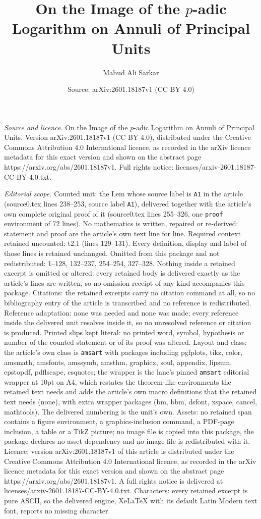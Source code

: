 \documentclass[10pt,a4paper]{amsart}
\title[On the Image of the $p$-adic Logarithm on Annuli of Principa]{On the Image of the $p$-adic Logarithm on Annuli of Principal Units}
\author{Mabud Ali Sarkar}
\date{Source: arXiv:2601.18187v1 (CC BY 4.0)}
\begin{document}
\maketitle

\noindent\emph{Source and licence.} On the Image of the $p$-adic Logarithm on Annuli of Principal Units. Version arXiv:2601.18187v1 (CC BY 4.0), distributed under the Creative Commons Attribution 4.0 International licence, as recorded in the arXiv licence metadata for this exact version and shown on the abstract page https://arxiv.org/abs/2601.18187v1. Full rights notice: licenses/arxiv-2601.18187-CC-BY-4.0.txt.\par\smallskip

\noindent\textit{Editorial scope.} Counted unit: the Lem whose source label is \texttt{A1} in the article (source0.tex lines 238--253, source label \texttt{A1}), delivered together with the article's own complete original proof of it (source0.tex lines 255--326, one \texttt{proof} environment of 72 lines). No mathematics is written, repaired or re-derived: statement and proof are the article's own text line for line. Required context retained uncounted: t2.1 (lines 129--131). Every definition, display and label of those lines is retained unchanged. Omitted from this package and not redistributed: 1--128, 132--237, 254--254, 327--328. Nothing inside a retained excerpt is omitted or altered: every retained body is delivered exactly as the article's lines are written, so no omission receipt of any kind accompanies this package. Citations: the retained excerpts carry no citation command at all, so no bibliography entry of the article is transcribed and no reference is redistributed. Reference adaptation: none was needed and none was made; every reference inside the delivered unit resolves inside it, so no unresolved reference or citation is produced. Printed slips kept literal: no printed word, symbol, hypothesis or number of the counted statement or of its proof was altered. Layout and class: the article's own class is \texttt{amsart} with packages including pgfplots, tikz, color, amsmath, amsfonts, amssymb, amsthm, graphicx, soul, appendix, lipsum, epstopdf, pdflscape, csquotes; the wrapper is the lane's pinned \texttt{amsart} editorial wrapper at 10pt on A4, which restates the theorem-like environments the retained text needs and adds the article's own macro definitions that the retained text needs (none), with extra wrapper packages (bm, bbm, dsfont, xspace, cancel, mathtools). The delivered numbering is the unit's own. Assets: no retained span contains a figure environment, a graphics-inclusion command, a PDF-page inclusion, a table or a TikZ picture; no image file is copied into this package, the package declares no asset dependency and no image file is redistributed with it. Licence: version arXiv:2601.18187v1 of this article is distributed under the Creative Commons Attribution 4.0 International licence, as recorded in the arXiv licence metadata for this exact version and shown on the abstract page https://arxiv.org/abs/2601.18187v1. A full rights notice is delivered at licenses/arxiv-2601.18187-CC-BY-4.0.txt. Characters: every retained excerpt is pure ASCII, so the delivered engine, XeLaTeX with its default Latin Modern text font, reports no missing character.
\end{document}
